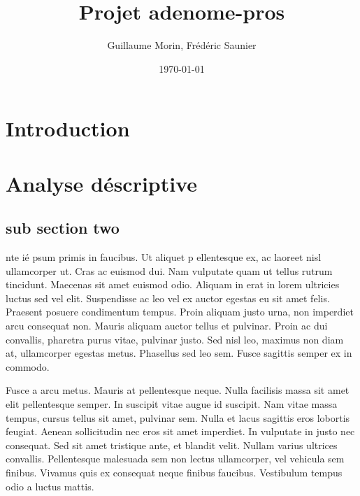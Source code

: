 \documentclass[12pt]{article}
\title{Projet  adenome-pros}
\author{Guillaume Morin, Frédéric Saunier}
\date{\today}
\begin{document}
\maketitle
\tableofcontents
\clearpage






\section{Introduction}


\section{Analyse déscriptive}


\subsection{sub section two}

nte ié psum primis in faucibus. Ut aliquet p ellentesque ex, ac laoreet nisl ullamcorper ut. Cras ac euismod dui. Nam vulputate quam ut tellus rutrum tincidunt. Maecenas sit amet euismod odio. Aliquam in erat in lorem ultricies luctus sed vel elit. Suspendisse ac leo vel ex auctor egestas eu sit amet felis. Praesent posuere condimentum tempus. Proin aliquam justo urna, non imperdiet arcu consequat non. Mauris aliquam auctor tellus et pulvinar. Proin ac dui convallis, pharetra purus vitae, pulvinar justo. Sed nisl leo, maximus non diam at, ullamcorper egestas metus. Phasellus sed leo sem. Fusce sagittis semper ex in commodo.

Fusce a arcu metus. Mauris at pellentesque neque. Nulla facilisis massa sit amet elit pellentesque semper. In suscipit vitae augue id suscipit. Nam vitae massa tempus, cursus tellus sit amet, pulvinar sem. Nulla et lacus sagittis eros lobortis feugiat. Aenean sollicitudin nec eros sit amet imperdiet. In vulputate in justo nec consequat. Sed sit amet tristique ante, et blandit velit. Nullam varius ultrices convallis. Pellentesque malesuada sem non lectus ullamcorper, vel vehicula sem finibus. Vivamus quis ex consequat neque finibus faucibus. Vestibulum tempus odio a luctus mattis.
\end{document}
